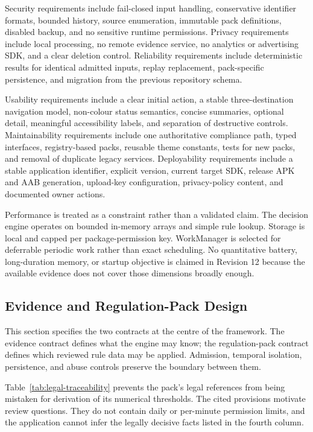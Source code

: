 Security requirements include fail-closed input handling, conservative identifier formats, bounded history, source enumeration, immutable pack definitions, disabled backup, and no sensitive runtime permissions. Privacy requirements include local processing, no remote evidence service, no analytics or advertising SDK, and a clear deletion control. Reliability requirements include deterministic results for identical admitted inputs, replay replacement, pack-specific persistence, and migration from the previous repository schema.

Usability requirements include a clear initial action, a stable three-destination navigation model, non-colour status semantics, concise summaries, optional detail, meaningful accessibility labels, and separation of destructive controls. Maintainability requirements include one authoritative compliance path, typed interfaces, registry-based packs, reusable theme constants, tests for new packs, and removal of duplicate legacy services. Deployability requirements include a stable application identifier, explicit version, current target SDK, release APK and AAB generation, upload-key configuration, privacy-policy content, and documented owner actions.

Performance is treated as a constraint rather than a validated claim. The decision engine operates on bounded in-memory arrays and simple rule lookup. Storage is local and capped per package-permission key. WorkManager is selected for deferrable periodic work rather than exact scheduling. No quantitative battery, long-duration memory, or startup objective is claimed in Revision 12 because the available evidence does not cover those dimensions broadly enough.

\subsection{Evidence and Regulation-Pack Design}

This section specifies the two contracts at the centre of the framework. The evidence contract defines what the engine may know; the regulation-pack contract defines which reviewed rule data may be applied. Admission, temporal isolation, persistence, and abuse controls preserve the boundary between them.

Table~\ref{tab:legal-traceability} prevents the pack's legal references from being mistaken for derivation of its numerical thresholds. The cited provisions motivate review questions. They do not contain daily or per-minute permission limits, and the application cannot infer the legally decisive facts listed in the fourth column.

